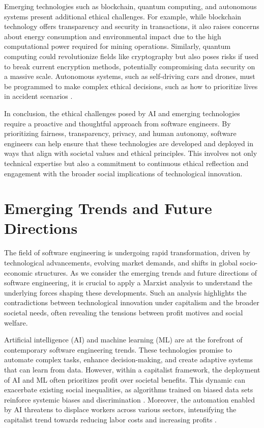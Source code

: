 \begin{refsection}
Emerging technologies such as blockchain, quantum computing, and autonomous systems present additional ethical challenges. For example, while blockchain technology offers transparency and security in transactions, it also raises concerns about energy consumption and environmental impact due to the high computational power required for mining operations. Similarly, quantum computing could revolutionize fields like cryptography but also poses risks if used to break current encryption methods, potentially compromising data security on a massive scale. Autonomous systems, such as self-driving cars and drones, must be programmed to make complex ethical decisions, such as how to prioritize lives in accident scenarios \cite[pp.~94-96]{bostrom2014superintelligence}.

In conclusion, the ethical challenges posed by AI and emerging technologies require a proactive and thoughtful approach from software engineers. By prioritizing fairness, transparency, privacy, and human autonomy, software engineers can help ensure that these technologies are developed and deployed in ways that align with societal values and ethical principles. This involves not only technical expertise but also a commitment to continuous ethical reflection and engagement with the broader social implications of technological innovation.

\section{Emerging Trends and Future Directions}

The field of software engineering is undergoing rapid transformation, driven by technological advancements, evolving market demands, and shifts in global socio-economic structures. As we consider the emerging trends and future directions of software engineering, it is crucial to apply a Marxist analysis to understand the underlying forces shaping these developments. Such an analysis highlights the contradictions between technological innovation under capitalism and the broader societal needs, often revealing the tensions between profit motives and social welfare.

Artificial intelligence (AI) and machine learning (ML) are at the forefront of contemporary software engineering trends. These technologies promise to automate complex tasks, enhance decision-making, and create adaptive systems that can learn from data. However, within a capitalist framework, the deployment of AI and ML often prioritizes profit over societal benefits. This dynamic can exacerbate existing social inequalities, as algorithms trained on biased data sets reinforce systemic biases and discrimination \cite[pp.~14-17]{noble2018algorithms}. Moreover, the automation enabled by AI threatens to displace workers across various sectors, intensifying the capitalist trend towards reducing labor costs and increasing profits \cite[pp.~375-377]{marx2008capital}.


\end{refsection}
